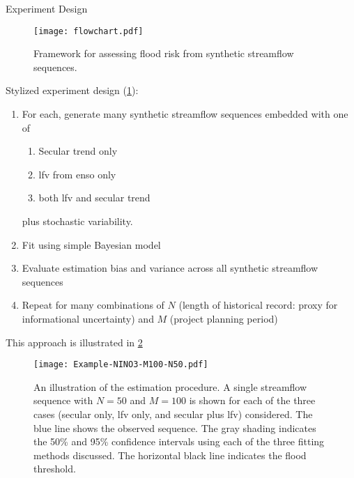 \begin{block}{Experiment Design}
    \begin{figure}
        \centering
        \texttt{[image: flowchart.pdf]}
        \caption{
          Framework for assessing flood risk from synthetic streamflow sequences.
        }\label{fig:methods-summary}
      \end{figure}
      Stylized experiment design (\cref{fig:methods-summary}):
      \begin{enumerate}
        \item For each, generate many synthetic streamflow sequences embedded with one of
        \begin{enumerate}
          \item Secular trend only
          \item \gls{lfv} from \gls{enso} only
          \item both \gls{lfv} and secular trend
        \end{enumerate}
        plus stochastic variability.
        \item Fit using simple Bayesian model
        \item Evaluate estimation bias and variance across all synthetic streamflow sequences
        \item Repeat for many combinations of $N$ (length of historical record: proxy for informational uncertainty) and $M$ (project planning period)
      \end{enumerate}
      This approach is illustrated in \cref{fig:example-fit}
      \begin{figure}
        \texttt{[image: Example-NINO3-M100-N50.pdf]}
        \caption{
          An illustration of the estimation procedure.
          A single streamflow sequence with $N=50$ and $M=100$ is shown for each of the three cases (secular only, \gls{lfv} only, and secular plus \gls{lfv}) considered.
          The blue line shows the observed sequence.
          The gray shading indicates the 50\% and 95\% confidence intervals using each of the three fitting methods discussed.
          The horizontal black line indicates the flood threshold.
        }\label{fig:example-fit}
      \end{figure}
\end{block}